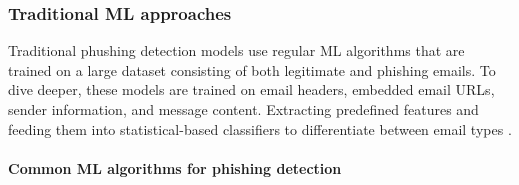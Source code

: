 \subsubsection*{Traditional ML approaches}
Traditional phushing detection models use regular ML algorithms that are trained on a large dataset consisting of both legitimate and phishing emails. To dive deeper, these models are trained on email headers, embedded email URLs, sender information, and message content. Extracting predefined features and feeding them into statistical-based classifiers to differentiate between email types \citep{chandrasekaran2006phishing}.

\paragraph{Common ML algorithms for phishing detection}
